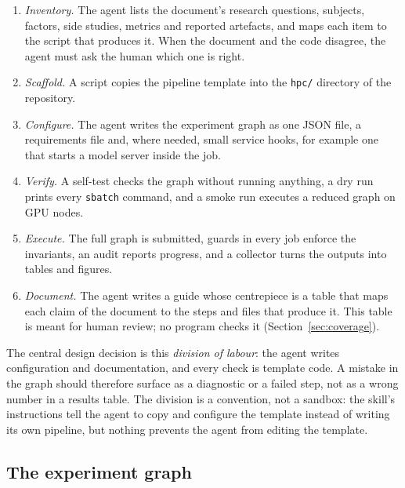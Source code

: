 \documentclass[pdflatex,sn-mathphys-num]{sn-jnl}
\theoremstyle{thmstyletwo}%
\theoremstyle{thmstylethree}%
\newcommand{\code}[1]{\texttt{#1}}
\begin{document}
\begin{enumerate}[leftmargin=1.4em, itemsep=1pt]
\item \emph{Inventory.} The agent lists the document's research questions, subjects, factors, side studies, metrics and reported artefacts, and maps each item to the script that produces it. When the document and the code disagree, the agent must ask the human which one is right.
\item \emph{Scaffold.} A script copies the pipeline template into the \code{hpc/} directory of the repository.
\item \emph{Configure.} The agent writes the experiment graph as one JSON file, a requirements file and, where needed, small service hooks, for example one that starts a model server inside the job.
\item \emph{Verify.} A self-test checks the graph without running anything, a dry run prints every \code{sbatch} command, and a smoke run executes a reduced graph on GPU nodes.
\item \emph{Execute.} The full graph is submitted, guards in every job enforce the invariants, an audit reports progress, and a collector turns the outputs into tables and figures.
\item \emph{Document.} The agent writes a guide whose centrepiece is a table that maps each claim of the document to the steps and files that produce it. This table is meant for human review; no program checks it (Section~\ref{sec:coverage}).
\end{enumerate}
The central design decision is this \emph{division of labour}: the agent writes configuration and documentation, and every check is template code. A mistake in the graph should therefore surface as a diagnostic or a failed step, not as a wrong number in a results table. The division is a convention, not a sandbox: the skill's instructions tell the agent to copy and configure the template instead of writing its own pipeline, but nothing prevents the agent from editing the template.

\subsection{The experiment graph}\label{sec:graph}
\end{document}
